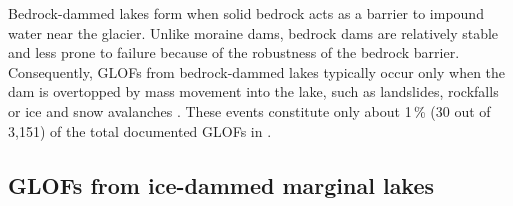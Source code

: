 

Bedrock-dammed lakes form when solid bedrock acts as a barrier to impound water near the glacier. Unlike moraine dams, bedrock dams are relatively stable and less prone to failure because of the robustness of the bedrock barrier. Consequently, GLOFs from bedrock-dammed lakes typically occur only when the dam is overtopped by mass movement into the lake, such as landslides, rockfalls or ice and snow avalanches \citep{Emmer2017, Huggel&al2004, Haeberli&al2017}. These events constitute only about 1\,\% (30 out of 3,151) of the total documented GLOFs in \cite{Lutzow&al2023}.


\subsection{GLOFs from ice-dammed marginal lakes}
\label{subsection:glofs_ice-dammed_lakes}


